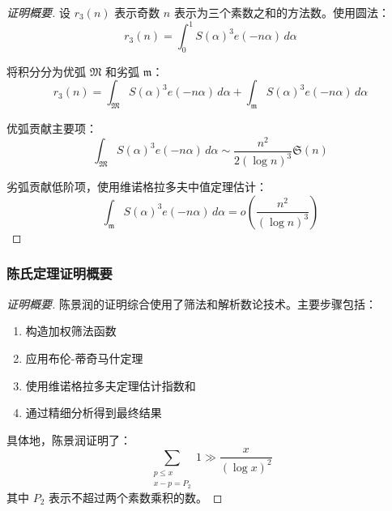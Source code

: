 \begin{proof}[证明概要]
    设 $r_3(n)$ 表示奇数 $n$ 表示为三个素数之和的方法数。使用圆法：
    \begin{equation}
        r_3(n) = \int_0^1 S(\alpha)^3 e(-n\alpha) \, d\alpha
    \end{equation}
    
    将积分分为优弧 $\mathfrak{M}$ 和劣弧 $\mathfrak{m}$：
    \begin{equation}
        r_3(n) = \int_{\mathfrak{M}} S(\alpha)^3 e(-n\alpha) \, d\alpha + \int_{\mathfrak{m}} S(\alpha)^3 e(-n\alpha) \, d\alpha
    \end{equation}
    
    优弧贡献主要项：
    \begin{equation}
        \int_{\mathfrak{M}} S(\alpha)^3 e(-n\alpha) \, d\alpha \sim \frac{n^2}{2(\log n)^3} \mathfrak{S}(n)
    \end{equation}
    
    劣弧贡献低阶项，使用维诺格拉多夫中值定理估计：
    \begin{equation}
        \int_{\mathfrak{m}} S(\alpha)^3 e(-n\alpha) \, d\alpha = o\left(\frac{n^2}{(\log n)^3}\right)
    \end{equation}
\end{proof}

\subsubsection{陈氏定理证明概要}

\begin{proof}[证明概要]
    陈景润的证明综合使用了筛法和解析数论技术。主要步骤包括：
    
    \begin{enumerate}
        \item 构造加权筛法函数
        \item 应用布伦-蒂奇马什定理
        \item 使用维诺格拉多夫定理估计指数和
        \item 通过精细分析得到最终结果
    \end{enumerate}
    
    具体地，陈景润证明了：
    \begin{equation}
        \sum_{\substack{p \leq x \\ x-p = P_2}} 1 \gg \frac{x}{(\log x)^2}
    \end{equation}
    其中 $P_2$ 表示不超过两个素数乘积的数。
\end{proof}

